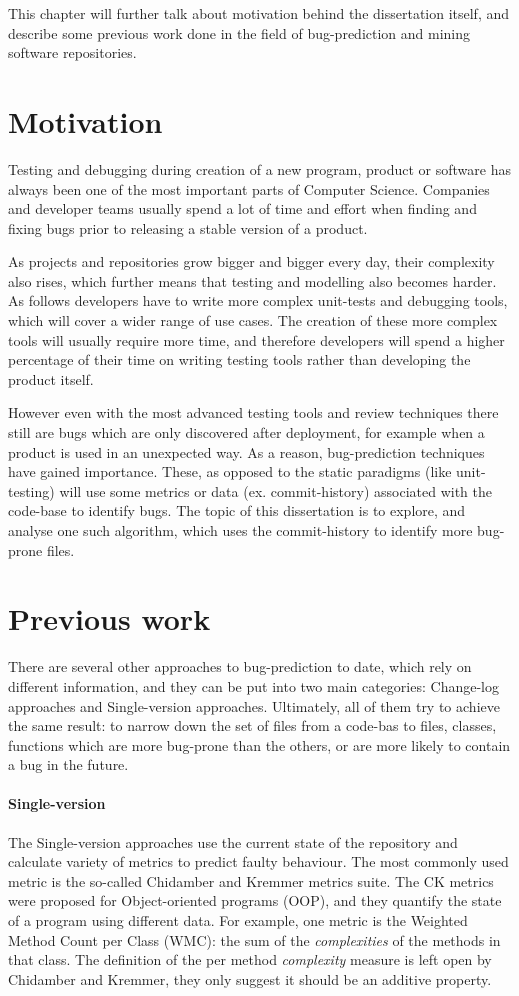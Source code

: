 \documentclass[12pt,twoside,notitlepage]{report}
\begin{document}
This chapter will further talk about motivation behind the dissertation itself, and describe some previous work done in the field of bug-prediction and mining software repositories.
\section{Motivation}
Testing and debugging during creation of a new program, product or software has always been one of the most important parts of Computer Science. Companies and developer teams usually spend a lot of time and effort when finding and fixing bugs prior to releasing a stable version of a product.

As  projects and repositories grow bigger and bigger every day, their complexity also rises, which further means that testing and modelling also becomes harder. As follows developers have to write more complex unit-tests and debugging tools, which will cover a wider range of use cases. The creation of these more complex tools will usually require more time, and therefore developers will spend a higher percentage of their time on writing testing tools rather than developing the product itself.

However even with the most advanced testing tools and review techniques there still are bugs which are only discovered after deployment, for example when a product is used in an unexpected way. As a reason, bug-prediction techniques have gained importance. These, as opposed to the static paradigms (like unit-testing) will use some metrics or data (ex. commit-history) associated with the code-base to identify bugs. The topic of this dissertation is to explore, and analyse one such algorithm, which uses the commit-history to identify more bug-prone files.

\section{Previous work}
There are several other approaches to bug-prediction to date, which rely on different information, and they can be put into two main categories: Change-log approaches and Single-version approaches\cite{5463279}. Ultimately, all of them try to achieve the same result: to narrow down the set of files from a code-bas to files, classes, functions which are more bug-prone than the others, or are more likely to contain a bug in the future.

\paragraph{Single-version}The Single-version approaches use the current state of the repository and calculate variety of metrics  to predict faulty behaviour. The most commonly used metric is the so-called Chidamber and Kremmer metrics suite\cite{295895}. The CK metrics were proposed for Object-oriented programs (OOP), and they quantify the state of a program using different data. For example, one metric is the Weighted Method Count per Class (WMC): the sum of the \textit{complexities} of the methods in that class. The definition of the per method \textit{complexity} measure is left open by Chidamber and Kremmer\cite{295895}, they only suggest it should be an additive property.
\end{document}
